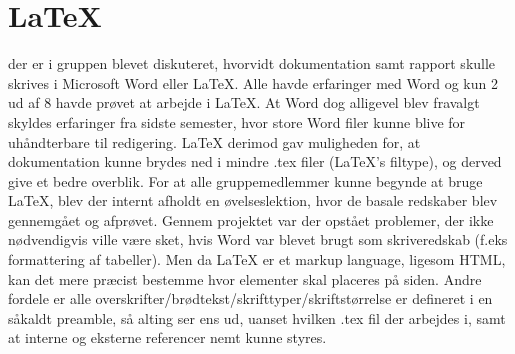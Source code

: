 \section{LaTeX}

der er i gruppen blevet diskuteret, hvorvidt dokumentation samt rapport skulle skrives i Microsoft Word eller LaTeX\cite{lib:LaTeX}. 
Alle havde erfaringer med Word og kun 2 ud af 8 havde prøvet at arbejde i LaTeX. 
At Word dog alligevel blev fravalgt skyldes erfaringer fra sidste semester, hvor store Word filer kunne blive for uhåndterbare til redigering. 
LaTeX derimod gav muligheden for, at dokumentation kunne brydes ned i mindre .tex filer (LaTeX's filtype), og derved give et bedre overblik.
For at alle gruppemedlemmer kunne begynde at bruge LaTeX, blev der internt afholdt en øvelseslektion, hvor de basale redskaber blev gennemgået og afprøvet.
Gennem projektet var der opstået problemer, der ikke nødvendigvis ville være sket, hvis Word var blevet brugt som skriveredskab (f.eks formattering af tabeller). 
Men da LaTeX er et markup language, ligesom HTML, kan det mere præcist bestemme hvor elementer skal placeres på siden. 
Andre fordele er alle overskrifter/brødtekst/skrifttyper/skriftstørrelse er defineret i en såkaldt preamble, så alting ser ens ud, uanset hvilken .tex fil der arbejdes i, samt at interne og eksterne referencer nemt kunne styres.